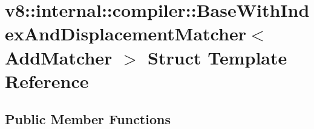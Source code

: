 \hypertarget{structv8_1_1internal_1_1compiler_1_1_base_with_index_and_displacement_matcher}{}\section{v8\+:\+:internal\+:\+:compiler\+:\+:Base\+With\+Index\+And\+Displacement\+Matcher$<$ Add\+Matcher $>$ Struct Template Reference}
\label{structv8_1_1internal_1_1compiler_1_1_base_with_index_and_displacement_matcher}
\subsection*{Public Member Functions}
